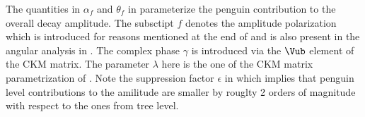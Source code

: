 \noindent The quantities in $\alpha_f$ and $\theta_f$ in  parameterize the penguin contribution to the overall \BsJpsiPhi
decay amplitude. The subsctipt $f$ denotes the \BsJpsiPhi amplitude polarization which is introduced for reasons mentioned at the end
of  and is also present in the \BsJpsiKst angular analysis in .
The complex phase $\gamma$ is introduced via the $\Vub$ element of the CKM matrix. The parameter $\lambda$ here is the one of the
CKM matrix parametrization of . Note the suppression factor $\epsilon$ in  which implies
that penguin level contributions to the \BsJpsiPhi amilitude are smaller by rouglty 2 orders of magnitude with respect to the ones from tree level.

